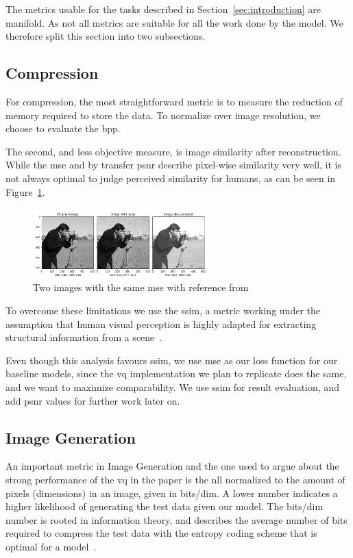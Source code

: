 The metrics usable for the tasks described in Section~\ref{sec:introduction} are manifold.
As not all metrics are suitable for all the work done by the model.
We therefore split this section into two subsections.

\subsection{Compression}\label{subsec:compression}
For compression, the most straightforward metric is to measure the reduction of memory required to
store the data.
To normalize over image resolution, we choose to evaluate the \ac{bpp}.

The second, and less objective measure, is image similarity after reconstruction.
While the \ac{mse} and by transfer \ac{psnr} describe pixel-wise similarity very well, it is not
always optimal to judge perceived similarity for humans, as can be seen in Figure~\ref{fig:mse_ssim}.

\begin{figure}[ht]
    \centering
    \includegraphics[width=0.6\textwidth]{images/ssim_mse}
    \caption{Two images with the same \ac{mse} with reference from~\cite{scikit-ssim}}
    \label{fig:mse_ssim}
\end{figure}

To overcome these limitations we use the \ac{ssim}, a metric working under the assumption that human visual
perception is highly adapted for extracting structural information from a scene~\cite{ssim}.

Even though this analysis favours \ac{ssim}, we use \ac{mse} as our loss function for our baseline models,
since the \ac{vq} implementation we plan to replicate does the same, and we want to maximize comparability.
We use \ac{ssim} for result evaluation, and add \ac{psnr} values for further work later on.

\subsection{Image Generation}\label{subsec:image-generation}
An important metric in Image Generation and the one used to argue about the strong performance of the \ac{vq} in the
paper is the \ac{nll} normalized to the amount of pixels (dimensions) in an image, given in bits/dim.
A lower number indicates a higher likelihood of generating the test data given our model.
The bits/dim number is rooted in information theory, and describes the average number of bits required to
compress the test data with the entropy coding scheme that is optimal for a model~\cite{shannon}.

